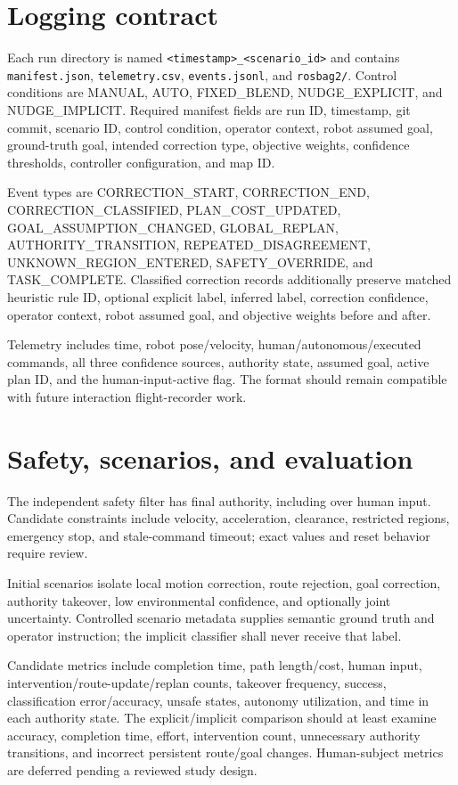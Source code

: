 \documentclass[11pt]{article}
\begin{document}
\section{Logging contract}
Each run directory is named \texttt{<timestamp>\_<scenario\_id>} and contains
\texttt{manifest.json}, \texttt{telemetry.csv}, \texttt{events.jsonl}, and
\texttt{rosbag2/}. Control conditions are MANUAL, AUTO, FIXED\_BLEND,
NUDGE\_EXPLICIT, and NUDGE\_IMPLICIT. Required manifest fields are run ID,
timestamp, git commit, scenario ID, control condition, operator context, robot
assumed goal, ground-truth goal, intended correction type, objective weights,
confidence thresholds, controller configuration, and map ID.

Event types are CORRECTION\_START, CORRECTION\_END,
CORRECTION\_CLASSIFIED, PLAN\_COST\_UPDATED, GOAL\_ASSUMPTION\_CHANGED,
GLOBAL\_REPLAN, AUTHORITY\_TRANSITION, REPEATED\_DISAGREEMENT,
UNKNOWN\_REGION\_ENTERED, SAFETY\_OVERRIDE, and TASK\_COMPLETE. Classified
correction records additionally preserve matched heuristic rule ID, optional
explicit label, inferred label, correction confidence, operator context,
robot assumed goal, and objective weights before and after.

Telemetry includes time, robot pose/velocity, human/autonomous/executed
commands, all three confidence sources, authority state, assumed goal, active
plan ID, and the human-input-active flag. The format should remain compatible
with future interaction flight-recorder work.

\section{Safety, scenarios, and evaluation}
The independent safety filter has final authority, including over human input.
Candidate constraints include velocity, acceleration, clearance, restricted
regions, emergency stop, and stale-command timeout; exact values and reset
behavior require review.

Initial scenarios isolate local motion correction, route rejection, goal
correction, authority takeover, low environmental confidence, and optionally
joint uncertainty. Controlled scenario metadata supplies semantic ground truth
and operator instruction; the implicit classifier shall never receive that
label.

Candidate metrics include completion time, path length/cost, human input,
intervention/route-update/replan counts, takeover frequency, success,
classification error/accuracy, unsafe states, autonomy utilization, and time in
each authority state. The explicit/implicit comparison should at least examine
accuracy, completion time, effort, intervention count, unnecessary authority
transitions, and incorrect persistent route/goal changes. Human-subject metrics
are deferred pending a reviewed study design.
\end{document}
